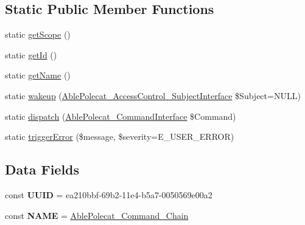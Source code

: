 \subsection*{Static Public Member Functions}
\begin{DoxyCompactItemize}
\item 
static \hyperlink{class_able_polecat___command___chain_ad9ade868bd136d32967059d1cccb3e92}{get\+Scope} ()
\item 
static \hyperlink{class_able_polecat___command___chain_acfaa3a96d0cb5a4c0d4d710dcba41e9e}{get\+Id} ()
\item 
static \hyperlink{class_able_polecat___command___chain_a4ef9bd37ba3ce8a13c1e8bcf4f72a630}{get\+Name} ()
\item 
static \hyperlink{class_able_polecat___command___chain_a3f2135f6ad45f51d075657f6d20db2cd}{wakeup} (\hyperlink{interface_able_polecat___access_control___subject_interface}{Able\+Polecat\+\_\+\+Access\+Control\+\_\+\+Subject\+Interface} \$Subject=N\+U\+L\+L)
\item 
static \hyperlink{class_able_polecat___command___chain_a8c95906f06450a060c5c9f0dc5b64fb5}{dispatch} (\hyperlink{interface_able_polecat___command_interface}{Able\+Polecat\+\_\+\+Command\+Interface} \$Command)
\item 
static \hyperlink{class_able_polecat___command___chain_a797ad7554e54abd2e572ae912eae9c70}{trigger\+Error} (\$message, \$severity=E\+\_\+\+U\+S\+E\+R\+\_\+\+E\+R\+R\+O\+R)
\end{DoxyCompactItemize}
\subsection*{Data Fields}
\begin{DoxyCompactItemize}
\item 
\hypertarget{class_able_polecat___command___chain_a74b892c8c0b86bf9d04c5819898c51e7}{}const {\bfseries U\+U\+I\+D} = \textquotesingle{}ea210bbf-\/69b2-\/11e4-\/b5a7-\/0050569e00a2\textquotesingle{}\label{class_able_polecat___command___chain_a74b892c8c0b86bf9d04c5819898c51e7}

\item 
\hypertarget{class_able_polecat___command___chain_a244352f035b82b20b0efa506167fd862}{}const {\bfseries N\+A\+M\+E} = \textquotesingle{}\hyperlink{class_able_polecat___command___chain}{Able\+Polecat\+\_\+\+Command\+\_\+\+Chain}\textquotesingle{}\label{class_able_polecat___command___chain_a244352f035b82b20b0efa506167fd862}

\end{DoxyCompactItemize}
